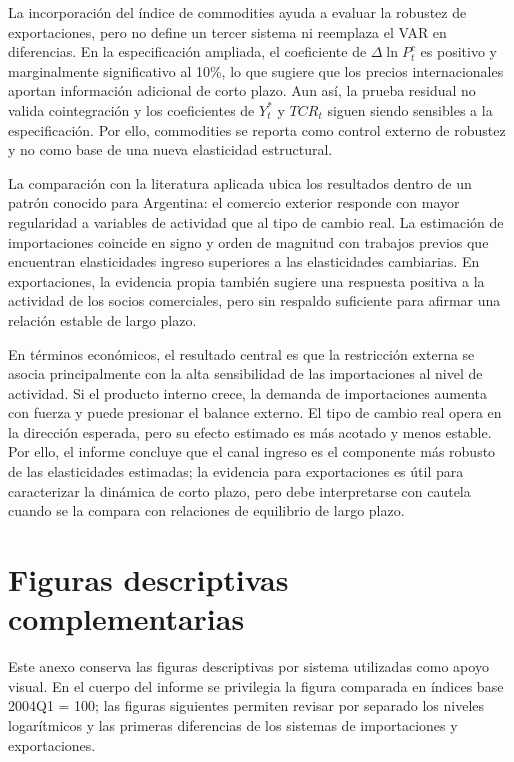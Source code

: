 \documentclass[11pt,a4paper]{article}
\begin{document}
	La incorporación del índice de commodities ayuda a evaluar la robustez de
	exportaciones, pero no define un tercer sistema ni reemplaza el VAR en
	diferencias. En la especificación ampliada, el coeficiente de
	\(\Delta \ln P_t^c\) es positivo y marginalmente significativo al 10\%, lo que
	sugiere que los precios internacionales aportan información adicional de corto
	plazo. Aun así, la prueba residual no valida cointegración y los coeficientes de
	\(Y_t^*\) y \(TCR_t\) siguen siendo sensibles a la especificación. Por ello,
	commodities se reporta como control externo de robustez y no como base de una
	nueva elasticidad estructural.
	
	La comparación con la literatura aplicada ubica los resultados dentro de un
	patrón conocido para Argentina: el comercio exterior responde con mayor
	regularidad a variables de actividad que al tipo de cambio real. La estimación
	de importaciones coincide en signo y orden de magnitud con trabajos previos que
	encuentran elasticidades ingreso superiores a las elasticidades cambiarias. En
	exportaciones, la evidencia propia también sugiere una respuesta positiva a la
	actividad de los socios comerciales, pero sin respaldo suficiente para afirmar
	una relación estable de largo plazo.
	
	En términos económicos, el resultado central es que la restricción externa se
	asocia principalmente con la alta sensibilidad de las importaciones al nivel de
	actividad. Si el producto interno crece, la demanda de importaciones aumenta
	con fuerza y puede presionar el balance externo. El tipo de cambio real opera
	en la dirección esperada, pero su efecto estimado es más acotado y menos
	estable. Por ello, el informe concluye que el canal ingreso es el componente
	más robusto de las elasticidades estimadas; la evidencia para exportaciones es
	útil para caracterizar la dinámica de corto plazo, pero debe interpretarse con
	cautela cuando se la compara con relaciones de equilibrio de largo plazo.

	\appendix
	\section{Figuras descriptivas complementarias}
	\label{app:figuras-descriptivas}
	
	Este anexo conserva las figuras descriptivas por sistema utilizadas como apoyo
	visual. En el cuerpo del informe se privilegia la figura comparada en índices
	base 2004Q1 = 100; las figuras siguientes permiten revisar por separado los
	niveles logarítmicos y las primeras diferencias de los sistemas de importaciones
	y exportaciones.
	
\end{document}
